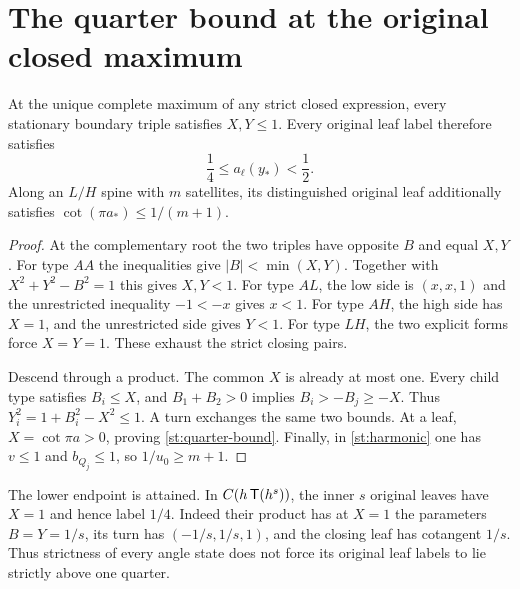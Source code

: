 \section{The quarter bound at the original closed maximum}
\begin{theorem}\label{st:quarter}
At the unique complete maximum of any strict closed
expression, every stationary boundary triple satisfies $X,Y\le1$.
Every original leaf label therefore satisfies
\begin{equation}\label{st:quarter-bound}
 \frac14\le a_\ell(y_*)<\frac12 .
\end{equation}
Along an $L/H$ spine with $m$ satellites, its
distinguished original leaf additionally satisfies
$\cot(\pi a_*)\le1/(m+1)$.
\end{theorem}
\begin{proof}
At the complementary root the two triples have
opposite $B$ and equal $X,Y$. For type $AA$ the
inequalities give $|B|<\min(X,Y)$.
Together with $X^2+Y^2-B^2=1$ this gives
$X,Y<1$. For type $AL$, the low side is
$(x,x,1)$ and the unrestricted inequality
$-1<-x$ gives $x<1$.
For type $AH$, the high side has $X=1$,
and the unrestricted side gives $Y<1$.
For type $LH$, the two explicit forms force
$X=Y=1$. These exhaust the strict closing pairs.

Descend through a product. The common $X$ is
already at most one. Every child type satisfies
$B_i\le X$, and $B_1+B_2>0$ implies
$B_i>-B_j\ge-X$. Thus
$Y_i^2=1+B_i^2-X^2\le1$.
A turn exchanges the same two bounds.
At a leaf, $X=\cot\pi a>0$, proving
\eqref{st:quarter-bound}. Finally, in
\eqref{st:harmonic} one has $v\le1$ and
$b_{Q_j}\le1$, so $1/u_0\ge m+1$.
\end{proof}
The lower endpoint is attained. In
$C(h\,\mathsf T(h^s))$, the inner $s$ original leaves
have $X=1$ and hence label $1/4$.
Indeed their product has at $X=1$ the parameters
$B=Y=1/s$, its turn has $(-1/s,1/s,1)$, and
the closing leaf has cotangent $1/s$.
Thus strictness of every angle state does not force
its original leaf labels to lie strictly above one quarter.
